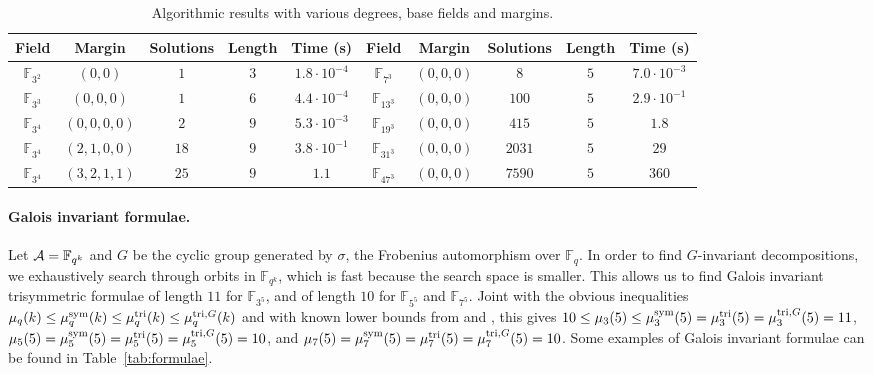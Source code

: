 \documentclass[11pt]{article}
\begin{document}
\begin{table}
  \centering
  \footnotesize
  \begin{tabular}{|c|c|c|c|c||c|c|c|c|c|}
    \hline
    Field & Margin & Solutions & Length & Time (s) & Field & Margin
    & Solutions & Length & Time (s) \\
    \hline
    \hline
    $\mathbb{F}_{3^2}$ & $(0, 0)$ & $1$ & $3$ & $1.8\cdot10^{-4}$ & $\mathbb{F}_{7^3}$ & $(0, 0, 0)$
    & $8$ & $5$ & $7.0\cdot10^{-3}$\\ 
    \hline
    $\mathbb{F}_{3^3}$ & $(0, 0, 0)$ & $1$ & $6$ & $4.4\cdot10^{-4}$ & $\mathbb{F}_{13^3}$ & $(0, 0, 0)$
    & $100$ & $5$ & $2.9\cdot10^{-1}$\\ 
    \hline
    $\mathbb{F}_{3^4}$ & $(0, 0, 0, 0)$ & $2$ & $9$ & $5.3\cdot10^{-3}$ & $\mathbb{F}_{19^3}$ & $(0, 0, 0)$
    & $415$ & $5$ & $1.8$\\ 
    \hline
    $\mathbb{F}_{3^4}$ & $(2, 1, 0, 0)$ & $18$ & $9$ & $3.8\cdot10^{-1}$ &
    $\mathbb{F}_{31^3}$ & $(0, 0, 0)$
    & $2031$ & $5$ & $29$\\ 
    \hline
    $\mathbb{F}_{3^4}$ & $(3, 2, 1, 1)$ & $25$ & $9$ & $1.1$ & $\mathbb{F}_{47^3}$ & $(0, 0, 0)$
    & $7590$ & $5$ & $360$\\ 
    \hline
  \end{tabular}
  \caption{Algorithmic results with various degrees, base fields and margins.}
  \label{tab:alg}
\end{table}

\paragraph{Galois invariant formulae.}
Let $\mathcal{A}=\mathbb{F}_{q^k}$ and $G$ be the cyclic group generated by $\sigma$, the Frobenius
automorphism over $\mathbb{F}_{q}$. In order to find $G$-invariant decompositions,
we exhaustively search through orbits in $\mathbb{F}_{q^k}$, which is fast
because the search space is smaller.
This allows us to find Galois invariant trisymmetric formulae of length $11$ for $\mathbb{F}_{3^5}$, and of length $10$ for $\mathbb{F}_{5^5}$ and $\mathbb{F}_{7^5}$.
Joint with the obvious inequalities $\mu_q(k)\leq\mu^{\textrm{sym}}_q(k)\leq\mu^{\textrm{tri}}_q(k)\leq\mu^{\textrm{tri},G}_q(k)$ and with known lower bounds from \cite[Thm. 2.2]{BCPRRR19} and \cite{BDEZ12},
this gives $10\leq\mu_3(5)\leq\mu^{\textrm{sym}}_3(5)=\mu^{\textrm{tri}}_3(5)=\mu^{\textrm{tri},G}_3(5)=11$,
$\mu_5(5)=\mu^{\textrm{sym}}_5(5)=\mu^{\textrm{tri}}_5(5)=\mu^{\textrm{tri},G}_5(5)=10$,
and $\mu_7(5)=\mu^{\textrm{sym}}_7(5)=\mu^{\textrm{tri}}_7(5)=\mu^{\textrm{tri},G}_7(5)=10$.
Some examples of Galois invariant formulae can be found in Table~\ref{tab:formulae}.
\end{document}
